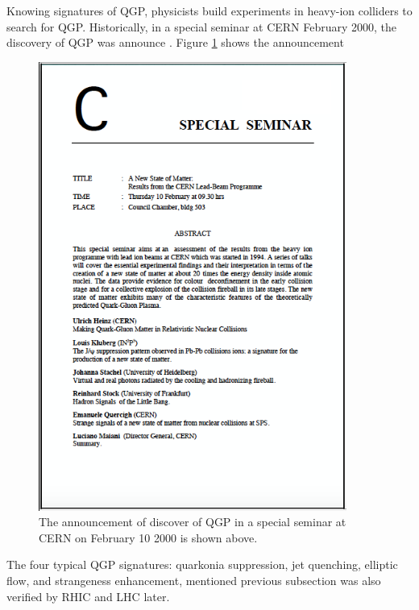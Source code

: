 Knowing signatures of QGP, physicists build experiments in heavy-ion colliders to search for QGP. Historically, in a special seminar at CERN February 2000, the discovery of QGP was announce \cite{SPSQGP}. Figure \ref{QGPDisSPS} shows the announcement

\begin{figure}[hbtp]
\begin{center}
\includegraphics[width=0.90\textwidth]{Figures/Chapter1/QGPDisSPS.png}
\caption{The announcement of discover of QGP in a special seminar at CERN on February 10 2000 is shown above.}
\label{QGPDisSPS}
\end{center}
\end{figure}  

The four typical QGP signatures: quarkonia suppression, jet quenching, elliptic flow, and strangeness enhancement, mentioned previous subsection was also verified by RHIC \cite{BRAHMS,PHOBOS,STAR,PHENIX} and LHC \cite{QGPLHC} later.

